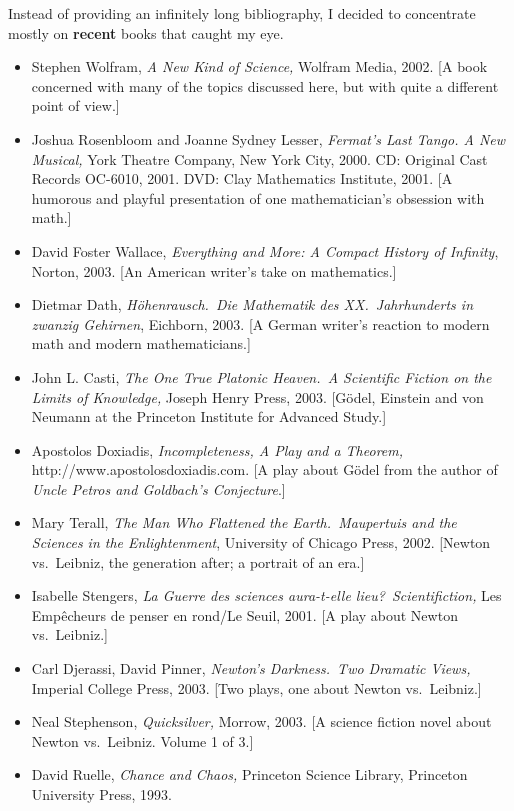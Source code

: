 \documentclass[12pt]{book}
\begin{document}
Instead of providing an infinitely long bibliography, I decided to concentrate
mostly on \textbf{recent} books that caught my eye.
\begin{itemize}
\item 
Stephen Wolfram, \emph{A New Kind of Science,} Wolfram Media, 2002.
[A book concerned with many of the topics discussed here,
but with quite a different point of view.]
\item 
Joshua Rosenbloom and Joanne Sydney Lesser,
\emph{Fermat's Last Tango. A New Musical,}
York Theatre Company, New York City, 2000.
CD: Original Cast Records OC-6010, 2001.
DVD: Clay Mathematics Institute, 2001.
[A humorous and playful presentation of one mathematician's obsession with math.]
\item
David Foster Wallace, \emph{Everything and More: A Compact History of Infinity},
Norton, 2003. [An American writer's take on mathematics.]
\item
Dietmar Dath, \emph{H\"ohenrausch.\ Die Mathematik des XX.\ Jahrhunderts in zwanzig Gehirnen}, 
Eichborn, 2003.
[A German writer's reaction to modern math and modern mathematicians.]
\item
John L. Casti, \emph{The One True Platonic Heaven.\ A Scientific Fiction on the Limits of
Knowledge,} Joseph Henry Press, 2003.
[G\"odel, Einstein and von Neumann at the Princeton Institute for Advanced Study.] 
\item
Apostolos Doxiadis, \emph{Incompleteness, A Play and a Theorem,}
http://www.apostolosdoxiadis.com.
[A play about G\"odel from the author of \emph{Uncle Petros and Goldbach's Conjecture}.]
\item
Mary Terall, \emph{The Man Who Flattened the Earth.\ Maupertuis and the Sciences in the
Enlightenment}, University of Chicago Press, 2002.
[Newton vs.\ Leibniz, the generation after; a portrait of an era.] 
\item
Isabelle Stengers, \emph{La Guerre des sciences aura-t-elle lieu?\ Scientifiction,}
Les Emp\^echeurs de penser en rond/Le Seuil, 2001.
[A play about Newton vs.\ Leibniz.]
\item
Carl Djerassi, 
David Pinner, \emph{Newton's Darkness.\ Two Dramatic Views,}
Imperial College Press, 2003.
[Two plays, one about Newton vs.\ Leibniz.]
\item
Neal Stephenson, \emph{Quicksilver,} Morrow, 2003.
[A science fiction novel about Newton vs.\ Leibniz. Volume 1 of 3.]
\item
David Ruelle, \emph{Chance and Chaos,} 
Princeton Science Library,
Princeton University Press, 1993.

\end{itemize}
\end{document}
